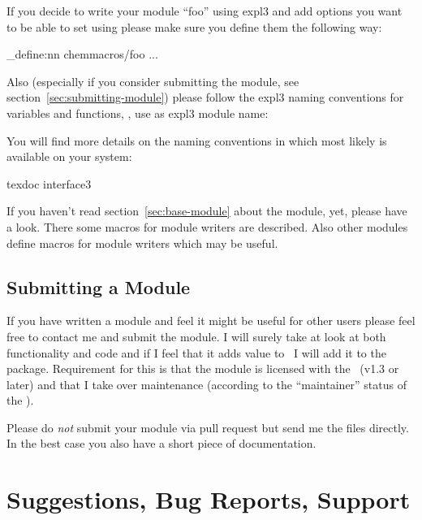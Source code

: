 \documentclass[load-preamble+]{cnltx-doc}
\def\chemmodule*#1{\textquotedblleft#1\textquotedblright}%
\begin{document}
If you decide to write your module \chemmodule*{foo} using expl3 and add
options you want to be able to set using
 please make sure you define them the
following way:
\begin{sourcecode}
  \keys_define:nn {chemmacros/foo} {
    ...
  }
\end{sourcecode}
Also (especially if you consider submitting the module, see
section~\vref{sec:submitting-module}) please follow the expl3 naming
conventions for variables and functions, \ie, use  as expl3
module name:
You will find more details on the naming conventions in 
which most likely is available on your system:
\begin{bash}
  texdoc interface3
\end{bash}
If you haven't read section~\vref{sec:base-module} about the 
module, yet, please have a look.  There some macros for module writers are
described.  Also other modules define macros for module writers which may be
useful.

\subsection{Submitting a Module}\label{sec:submitting-module}

If you have written a module and feel it might be useful for other users
please feel free to contact me and submit the module.  I will surely take at
look at both functionality and code and if I feel that it adds value to
\chemmacros\ I will add it to the package.  Requirement for this is that the
module is licensed with the \LPPL\ (v1.3 or later) and that I take over
maintenance (according to the \enquote{maintainer} status of the \lppl).

Please do \emph{not} submit your module via pull request but send me the files
directly.  In the best case you also have a short piece of documentation.

\section{Suggestions, Bug Reports, Support}\label{sec:sugg-bug-reports}
\end{document}
